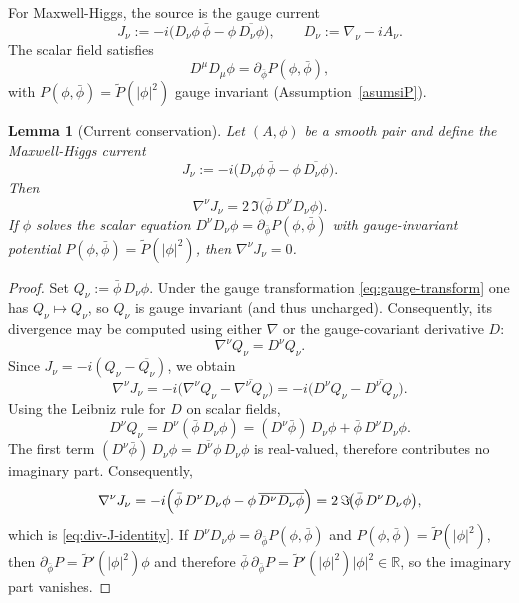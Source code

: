 \documentclass[11pt]{article}
\numberwithin{equation}{section}
\theoremstyle{plain}
\newtheorem{lemma}[theorem]{Lemma}
\theoremstyle{definition}
\theoremstyle{remark}
\begin{document}
For Maxwell-Higgs, the source is the gauge current
\begin{equation}
J_\nu:=-i\bigl(D_\nu\phi\,\bar\phi-\phi\,\overline{D_\nu\phi}\bigr),
\qquad D_\nu:=\nabla_\nu-iA_\nu.
\end{equation}
The scalar field satisfies
\begin{equation}
D^\mu D_\mu\phi=\partial_{\bar\phi}P(\phi,\bar\phi),
\end{equation}
with $P(\phi,\bar\phi)=\widetilde P(|\phi|^2)$ gauge invariant (Assumption~\ref{asumsiP}).

\begin{lemma}[Current conservation]\label{lem:current-conservation-schwarzschild}
Let $(A,\phi)$ be a smooth pair and define the Maxwell-Higgs current
\begin{equation}
J_\nu:=-i\bigl(D_\nu\phi\,\bar\phi-\phi\,\overline{D_\nu\phi}\bigr).
\end{equation}
Then
\begin{equation}\label{eq:div-J-identity}
\nabla^\nu J_\nu=2\,\Im\!\bigl(\bar\phi\,D^\nu D_\nu\phi\bigr).
\end{equation}
If $\phi$ solves the scalar equation $D^\nu D_\nu\phi=\partial_{\bar\phi}P(\phi,\bar\phi)$ with gauge-invariant potential $P(\phi,\bar\phi)=\widetilde P(|\phi|^2)$,
then $\nabla^\nu J_\nu=0$.
\end{lemma}

\begin{proof}
Set $Q_\nu:=\bar\phi\,D_\nu\phi$.
Under the gauge transformation \eqref{eq:gauge-transform} one has $Q_\nu\mapsto Q_\nu$, so $Q_\nu$ is gauge invariant (and thus uncharged).
Consequently, its divergence may be computed using either $\nabla$ or the gauge-covariant derivative $D$:
\begin{equation}
\nabla^\nu Q_\nu=D^\nu Q_\nu.
\end{equation}
Since $J_\nu=-i(Q_\nu-\overline{Q_\nu})$, we obtain
\begin{equation}
\nabla^\nu J_\nu
=-i\bigl(\nabla^\nu Q_\nu-\overline{\nabla^\nu Q_\nu}\bigr)
=-i\bigl(D^\nu Q_\nu-\overline{D^\nu Q_\nu}\bigr).
\end{equation}
Using the Leibniz rule for $D$ on scalar fields,
\begin{equation}
D^\nu Q_\nu
=
D^\nu(\bar\phi\,D_\nu\phi)
=
(D^\nu\bar\phi)\,D_\nu\phi+\bar\phi\,D^\nu D_\nu\phi.
\end{equation}
The first term $(D^\nu\bar\phi)\,D_\nu\phi=\overline{D^\nu\phi}\,D_\nu\phi$ is real-valued, therefore contributes no imaginary part.
Consequently,
\begin{equation}
\nabla^\nu J_\nu
=
-i\Bigl(\bar\phi\,D^\nu D_\nu\phi-\phi\,\overline{D^\nu D_\nu\phi}\Bigr)
=
2\,\Im\!\bigl(\bar\phi\,D^\nu D_\nu\phi\bigr),
\end{equation}
which is \eqref{eq:div-J-identity}.
If $D^\nu D_\nu\phi=\partial_{\bar\phi}P(\phi,\bar\phi)$ and $P(\phi,\bar\phi)=\widetilde P(|\phi|^2)$, then $\partial_{\bar\phi}P=\widetilde P'(|\phi|^2)\phi$ and therefore
$\bar\phi\,\partial_{\bar\phi}P=\widetilde P'(|\phi|^2)|\phi|^2\in\mathbb R$, so the imaginary part vanishes.
\end{proof}
\end{document}
